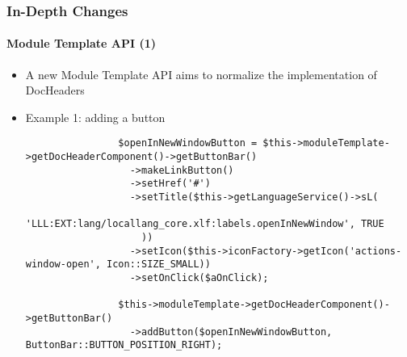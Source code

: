 \begin{frame}[fragile]
	\frametitle{In-Depth Changes}
	\framesubtitle{Module Template API (1)}

	\lstset{basicstyle=\tiny\ttfamily}

	\begin{itemize}

		\item A new Module Template API aims to normalize the implementation of DocHeaders

		\item Example 1: adding a button

			\begin{lstlisting}
				$openInNewWindowButton = $this->moduleTemplate->getDocHeaderComponent()->getButtonBar()
				  ->makeLinkButton()
				  ->setHref('#')
				  ->setTitle($this->getLanguageService()->sL(
				    'LLL:EXT:lang/locallang_core.xlf:labels.openInNewWindow', TRUE
				    ))
				  ->setIcon($this->iconFactory->getIcon('actions-window-open', Icon::SIZE_SMALL))
				  ->setOnClick($aOnClick);

				$this->moduleTemplate->getDocHeaderComponent()->getButtonBar()
				  ->addButton($openInNewWindowButton, ButtonBar::BUTTON_POSITION_RIGHT);
			\end{lstlisting}
	\end{itemize}

\end{frame}


